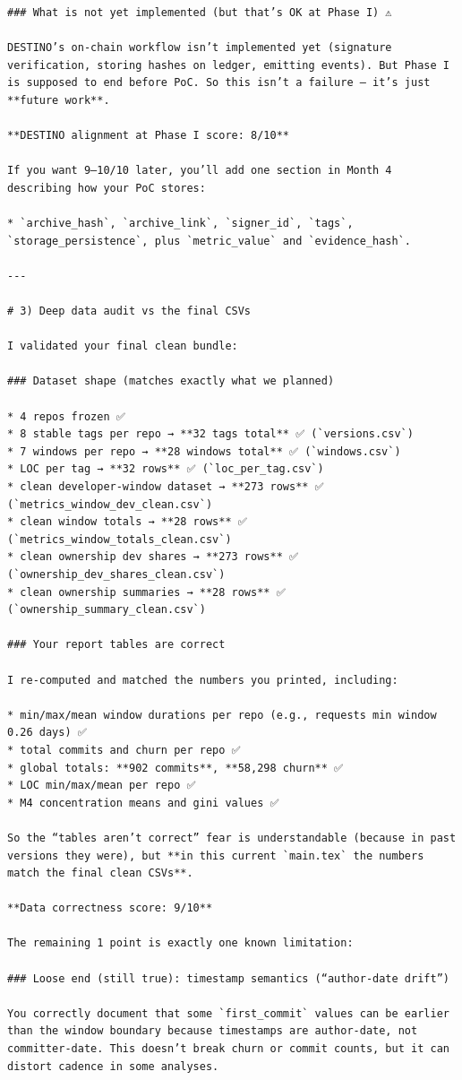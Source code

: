 \documentclass[11pt,a4paper]{article}
\begin{document}
\begin{verbatim}
### What is not yet implemented (but that’s OK at Phase I) ⚠️

DESTINO’s on-chain workflow isn’t implemented yet (signature verification, storing hashes on ledger, emitting events). But Phase I is supposed to end before PoC. So this isn’t a failure — it’s just **future work**.

**DESTINO alignment at Phase I score: 8/10**

If you want 9–10/10 later, you’ll add one section in Month 4 describing how your PoC stores:

* `archive_hash`, `archive_link`, `signer_id`, `tags`, `storage_persistence`, plus `metric_value` and `evidence_hash`.

---

# 3) Deep data audit vs the final CSVs

I validated your final clean bundle:

### Dataset shape (matches exactly what we planned)

* 4 repos frozen ✅
* 8 stable tags per repo → **32 tags total** ✅ (`versions.csv`)
* 7 windows per repo → **28 windows total** ✅ (`windows.csv`)
* LOC per tag → **32 rows** ✅ (`loc_per_tag.csv`)
* clean developer-window dataset → **273 rows** ✅ (`metrics_window_dev_clean.csv`)
* clean window totals → **28 rows** ✅ (`metrics_window_totals_clean.csv`)
* clean ownership dev shares → **273 rows** ✅ (`ownership_dev_shares_clean.csv`)
* clean ownership summaries → **28 rows** ✅ (`ownership_summary_clean.csv`)

### Your report tables are correct

I re-computed and matched the numbers you printed, including:

* min/max/mean window durations per repo (e.g., requests min window 0.26 days) ✅
* total commits and churn per repo ✅
* global totals: **902 commits**, **58,298 churn** ✅
* LOC min/max/mean per repo ✅
* M4 concentration means and gini values ✅

So the “tables aren’t correct” fear is understandable (because in past versions they were), but **in this current `main.tex` the numbers match the final clean CSVs**.

**Data correctness score: 9/10**

The remaining 1 point is exactly one known limitation:

### Loose end (still true): timestamp semantics (“author-date drift”)

You correctly document that some `first_commit` values can be earlier than the window boundary because timestamps are author-date, not committer-date. This doesn’t break churn or commit counts, but it can distort cadence in some analyses.


\end{verbatim}
\end{document}
